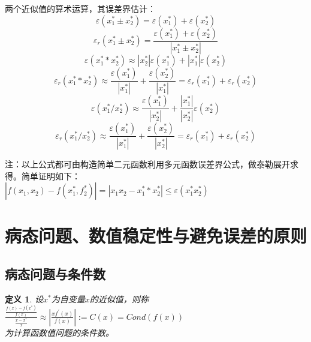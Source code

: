 \documentclass[a4paper]{article}
\newtheorem{definition}{定义}[section]
\begin{document}
两个近似值的算术运算，其误差界估计：
\begin{equation}
\varepsilon(x_1^* \pm x_2^*)=\varepsilon(x_1^*) + \varepsilon(x_2^*)
\end{equation}
\begin{equation}
\varepsilon_r(x^*_1 \pm x^*_2) = \frac{\varepsilon(x_1^*) + \varepsilon(x_2^*)}{|x^*_1 \pm x^*_2|}
\end{equation}
\begin{equation}
\varepsilon(x^*_1 * x^*_2) \approx |x^*_2|\varepsilon(x_1^*) + |x^*_1|\varepsilon(x_2^*)
\end{equation}
\begin{equation}
\varepsilon_r(x^*_1 * x^*_2) \approx \frac{\varepsilon(x^*_1)}{|x^*_1|} + \frac{\varepsilon(x_2^*)}{|x_1^*|} = \varepsilon_r(x_1^*) + \varepsilon_r(x^*_2)
\end{equation}
\begin{equation}
\varepsilon(x^*_1 / x^*_2) \approx \frac{\varepsilon(x^*_1)}{|x^*_2|} + \frac{|x^*_1|}{|x^*_2|}\varepsilon(x^*_2)
\end{equation}
\begin{equation}
\varepsilon_r(x^*_1 / x^*_2) \approx \frac{\varepsilon(x^*_1)}{|x^*_1|} + \frac{\varepsilon(x^*_2)}{|x^*_2|} = \varepsilon_r(x_1^*) + \varepsilon_r(x^*_2)
\end{equation}

注：以上公式都可由构造简单二元函数利用多元函数误差界公式，做泰勒展开求得。简单证明如下：\\
$|f(x_1, x_2) - f(x^*_1, f^*_2)|=|x_1x_2-x^*_1*x^*_2|\le \varepsilon(x^*_1x^*_2)$

\section{病态问题、数值稳定性与避免误差的原则}

\subsection{病态问题与条件数}

\begin{definition}
设$x^*$为自变量$x$的近似值，则称\\
$\frac{\frac{f(x)-f(x^*)}{f(x)}}{\frac{x-x^*}{x}} \approx |\frac{xf^{'}(x)}{f(x)}| := C(x) = Cond(f(x))$ \\
为计算函数值问题的条件数。
\end{definition}
\end{document}
